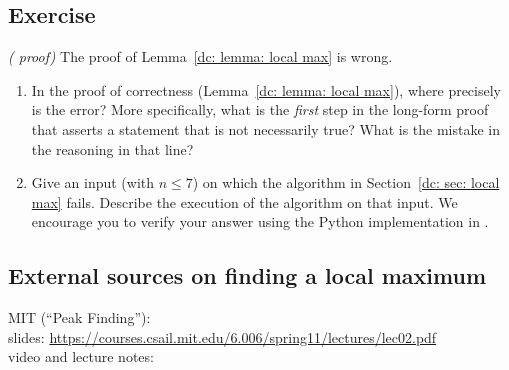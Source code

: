 
\subsection{Exercise}
\exercise\label{dc: exercise: local max} \emph{( proof)}
The proof of Lemma~\ref{dc: lemma: local max} is wrong.

\begin{enumerate}[label=(\alph*)]
\item In the proof of correctness (Lemma~\ref{dc: lemma: local max}),
where precisely is the error?  More specifically,
what is the \emph{first} step in the long-form proof that asserts a statement that is not necessarily true?  What is the mistake in the reasoning in that line?

\item Give an input (with $n\le 7$) on which the  algorithm in Section~\ref{dc: sec: local max} fails.
  Describe the execution of the algorithm on that input.
  We encourage you to verify your answer using the Python implementation in
  .  
\end{enumerate}


\subsection{External sources on finding a local maximum}

\begin{mylist}[-]
\item MIT (``Peak Finding''):
  \\ slides: \url{https://courses.csail.mit.edu/6.006/spring11/lectures/lec02.pdf}
  \\ video and lecture notes: 
\end{mylist}

